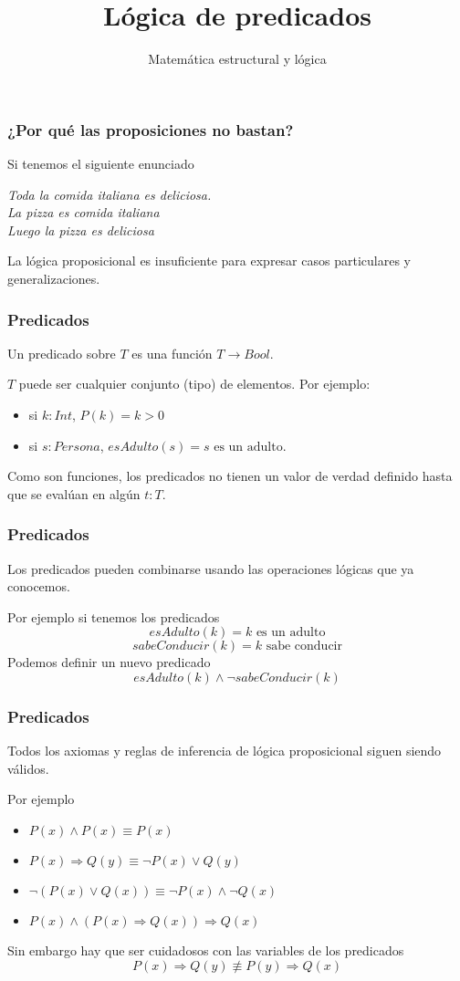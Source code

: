 \documentclass{beamer}
\title{Lógica de predicados}
\author{Matemática estructural y lógica}
\institute{ISIS-1104}
\date{}
\newcommand{\then}{\Rightarrow}
\begin{document}
\frame{\titlepage}

\begin{frame}[fragile]
    \frametitle{¿Por qué las proposiciones no bastan?}

    Si tenemos el siguiente enunciado
    \begin{center}
        \textit{Toda la comida italiana es deliciosa.\\ 
        La pizza es comida italiana\\
        Luego la pizza es deliciosa}
    \end{center}
    
    La lógica proposicional es insuficiente para expresar casos particulares y generalizaciones.
\end{frame}

\begin{frame}[fragile]
    \frametitle{Predicados}
        Un predicado sobre $T$ es una función $T \rightarrow Bool$.

        $T$ puede ser cualquier conjunto (tipo) de elementos. Por ejemplo:

        \begin{itemize}
            \item si $k: Int$, $P(k) = k > 0$
            \item si $s:Persona$, $esAdulto(s) = s\text{ es un adulto}$.
        \end{itemize}

        Como son funciones, los predicados no tienen un valor de verdad definido hasta que se evalúan en algún $t:T$.
\end{frame}

\begin{frame}[fragile]
    \frametitle{Predicados}
        Los predicados pueden combinarse usando las operaciones lógicas que ya conocemos.

        Por ejemplo si tenemos los predicados
        $$esAdulto(k) = k\text{ es un adulto}$$
        $$sabeConducir(k) = k\text{ sabe conducir}$$
        Podemos definir un nuevo predicado
        $$esAdulto(k) \land \lnot sabeConducir(k)$$
\end{frame}
\begin{frame}[fragile]
    \frametitle{Predicados}
        Todos los axiomas y reglas de inferencia de lógica proposicional siguen siendo válidos.

        Por ejemplo
        \begin{itemize}
            \item $P(x) \land P(x) \equiv P(x)$
            \item $P(x) \then Q(y) \equiv \lnot P(x) \lor Q(y)$
            \item $\lnot(P(x) \lor Q(x)) \equiv \lnot P(x) \land \lnot Q(x)$
            \item $P(x) \land (P(x) \then Q(x)) \then Q(x)$
        \end{itemize}

        Sin embargo hay que ser cuidadosos con las variables de los predicados
        $$P(x) \then Q(y) \not \equiv P(y) \then Q(x)$$
\end{frame}
\end{document}
